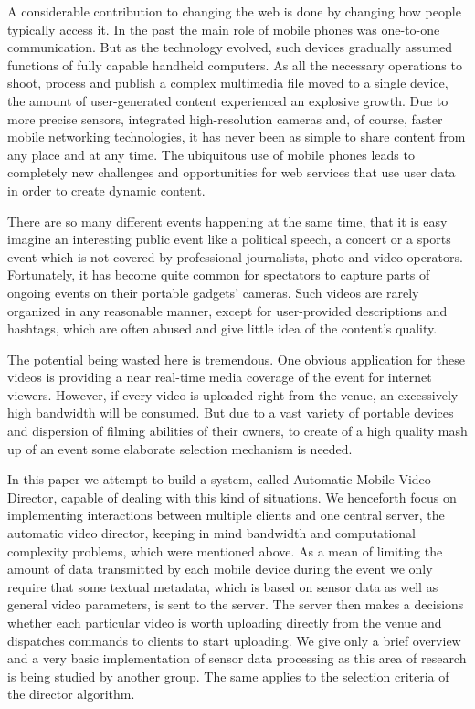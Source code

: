 \documentclass[conference]{IEEEtran}
\begin{document}
A considerable contribution to changing the web is done by changing how people typically access it.
In the past the main role of mobile phones was one-to-one communication. 
But as the technology evolved, such devices gradually assumed functions of fully capable handheld computers.
As all the necessary operations to shoot, process and publish a complex multimedia file moved to a single device, 
the amount of user-generated content experienced an explosive growth.
Due to more precise sensors, integrated high-resolution cameras and, of course, faster mobile networking technologies, 
it has never been as simple to share content from any place and at any time.
The ubiquitous use of mobile phones leads to completely new challenges and opportunities for web services 
that use user data in order to create dynamic content.

There are so many different events happening at the same time, 
that it is easy imagine an interesting public event like a political speech, 
a concert or a sports event which is not covered by professional journalists, photo and video operators.
Fortunately, it has become quite common for spectators to capture parts of ongoing events on their portable gadgets' cameras.
Such videos are rarely organized in any reasonable manner, except for user-provided descriptions and hashtags, 
which are often abused and give little idea of the content's quality.

The potential being wasted here is tremendous. 
One obvious application for these videos is providing a near real-time media coverage of the event for internet viewers.
However, if every video is uploaded right from the venue, an excessively high bandwidth will be consumed.
But due to a vast variety of portable devices and dispersion of filming abilities of their owners,
to create of a high quality mash up of an event some elaborate selection mechanism is needed.

In this paper we attempt to build a system, called Automatic Mobile Video Director, capable of dealing with this kind of situations.
We henceforth focus on implementing interactions between multiple clients and one central server, the automatic video director,
keeping in mind bandwidth and computational complexity problems, which were mentioned above. 
As a mean of limiting the amount of data transmitted by each mobile device during the event we only require 
that some textual metadata, which is based on sensor data as well as general video parameters, is sent to the server.
The server then makes a decisions whether each particular video is worth uploading directly from the venue
and dispatches commands to clients to start uploading.
We give only a brief overview and a very basic implementation of sensor data processing as this area of research 
is being studied by another group. The same applies to the selection criteria of the director algorithm.
\end{document}
